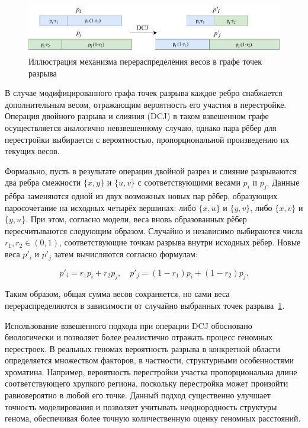 \begin{figure}[h!]
    \includegraphics[width=\linewidth]{images/part1/weights-redistribution.pdf}
    \caption{Иллюстрация механизма перераспределения весов в графе точек разрыва}
    \label{fig:weights-redistribution}
\end{figure}

В случае модифицированного графа точек разрыва каждое ребро снабжается дополнительным весом, отражающим вероятность его участия в перестройке. 
Операция двойного разрыва и слияния (DCJ) в таком взвешенном графе осуществляется аналогично невзвешенному случаю, однако пара рёбер для перестройки выбирается с вероятностью, пропорциональной произведению их текущих весов. 

Формально, пусть в результате операции двойной разрез и слияние разрываются два ребра смежности $\{x, y\}$ и $\{u, v\}$ с соответствующими весами $p_i$ и $p_j$.
Данные рёбра заменяются одной из двух возможных новых пар рёбер, образующих паросочетание на исходных четырёх вершинах: либо $\{x, u\}$ и $\{y, v\}$, либо $\{x, v\}$ и $\{y, u\}$.
При этом, согласно модели, веса вновь образованных рёбер пересчитываются следующим образом.
Случайно и независимо выбираются числа $r_1, r_2 \in (0, 1)$, соответствующие точкам разрыва внутри исходных рёбер.
Новые веса $p'_i$ и $p'_j$ затем вычисляются согласно формулам:

\[
p'_i = r_1 p_i + r_2 p_j,\quad p'_j = (1 - r_1) p_i + (1 - r_2) p_j.
\]

Таким образом, общая сумма весов сохраняется, но сами веса перераспределяются в зависимости от случайно выбранных точек разрыва~\ref{fig:weights-redistribution}.

Использование взвешенного подхода при операции DCJ обосновано биологически и позволяет более реалистично отражать процесс геномных перестроек.
В реальных геномах вероятность разрыва в конкретной области определяется множеством факторов, в частности, структурными особенностями хроматина. Например, вероятность перестройки участка пропорциональна длине соответствующего хрупкого региона, поскольку перестройка может произойти равновероятно в любой его точке.
Данный подход существенно улучшает точность моделирования и позволяет учитывать неоднородность структуры генома, обеспечивая более точную количественную оценку геномных расстояний.

